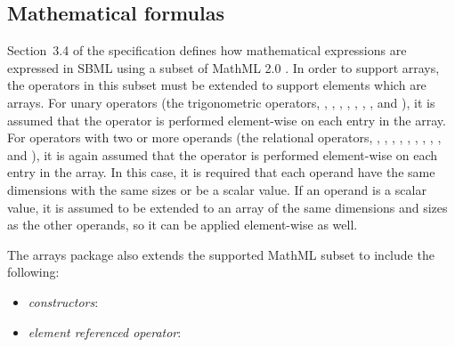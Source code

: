 \subsection{Mathematical formulas}
\label{math-formulas}
Section~3.4 of the \sbmlthreecore specification defines how mathematical expressions are expressed in SBML using a subset of MathML 2.0 \citep{w3c:2000b}.  In order to support arrays, the operators in this subset must be extended to support  elements which are arrays.  For unary operators (the trigonometric operators, , , , , , , , and ), it is assumed that the operator is performed element-wise on each entry in the array.  For operators with two or more operands (the relational operators, , , , , , , , , , and ), it is again assumed that the operator is performed element-wise on each entry in the array.  In this case, it is required that each operand have the same dimensions with the same sizes or be a scalar value.  If an operand is a scalar value, it is assumed to be extended to an array of the same dimensions and sizes as the other operands, so it can be applied element-wise as well.  

The arrays package also extends the supported MathML subset to include the following:
\begin{itemize}
\item \emph{constructors}: 
\item \emph{element referenced operator}: 
\end{itemize}


